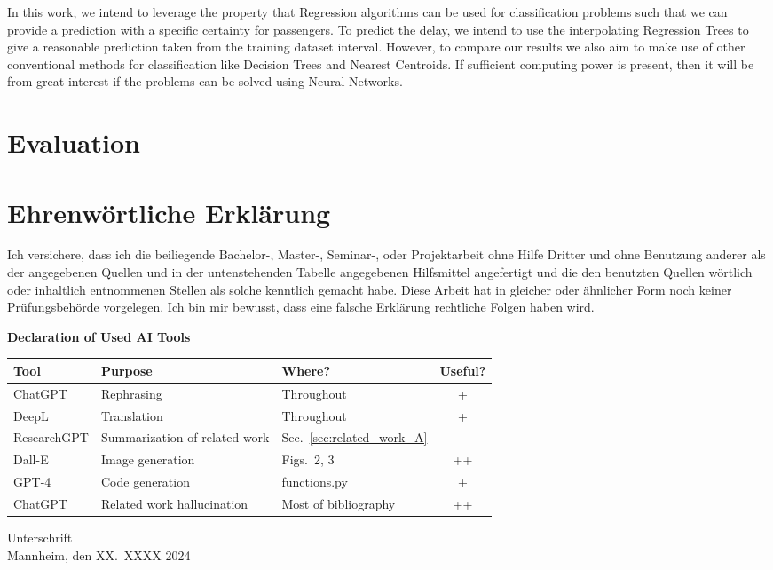\documentclass[a4paper,oneside,bibliography=totoc]{scrbook}
\begin{document}
In this work, we intend to leverage the property that Regression algorithms can be used for classification problems such that we can provide a prediction with a specific certainty for passengers. To predict the delay, we intend to
use the interpolating Regression Trees to give a reasonable prediction taken from the training dataset interval. However, to compare our results we also aim to make use of other conventional methods for classification like Decision Trees and Nearest Centroids.
If sufficient computing power is present, then it will be from great interest if the problems can be solved using Neural Networks.

\chapter{Evaluation}\label{ch:eval}



\backmatter
\chapter{Ehrenwörtliche Erklärung}

Ich versichere, dass ich die beiliegende Bachelor-, Master-, Seminar-, oder
Projektarbeit ohne Hilfe Dritter und ohne Benutzung anderer als der angegebenen
Quellen und in der untenstehenden Tabelle angegebenen Hilfsmittel angefertigt
und die den benutzten Quellen wörtlich oder inhaltlich entnommenen Stellen als
solche kenntlich gemacht habe. Diese Arbeit hat in gleicher oder ähnlicher Form
noch keiner Prüfungsbehörde vorgelegen. Ich bin mir bewusst, dass eine falsche
Erklärung rechtliche Folgen haben wird.

\begin{center}
  \textbf{Declaration of Used AI Tools} \\[.3em]
  \begin{tabularx}{\textwidth}{lXlc}
    \toprule
    Tool & Purpose & Where? & Useful? \\
    \midrule
    ChatGPT & Rephrasing & Throughout & + \\
    DeepL & Translation & Throughout & + \\
    ResearchGPT & Summarization of related work & Sec.~\ref{sec:related_work_A} & - \\
    Dall-E & Image generation & Figs.~2, 3 & ++ \\
    GPT-4 & Code generation & functions.py & + \\
    ChatGPT & Related work hallucination & Most of bibliography & ++ \\
    \bottomrule
  \end{tabularx}
\end{center}

\vspace{2cm}
\noindent Unterschrift\\
\noindent Mannheim, den XX.~XXXX 2024 \hfill
\end{document}
